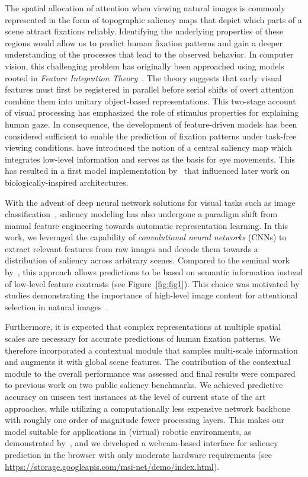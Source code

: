 \documentclass[final,1p,times,number]{elsarticle}
\begin{document}
The spatial allocation of attention when viewing natural images is commonly represented in the form of topographic saliency maps that depict which parts of a scene attract fixations reliably. Identifying the underlying properties of these regions would allow us to predict human fixation patterns and gain a deeper understanding of the processes that lead to the observed behavior. In computer vision, this challenging problem has originally been approached using models rooted in \textit{Feature Integration Theory}~\cite{treisman1980feature}. The theory suggests that early visual features must first be registered in parallel before serial shifts of overt attention combine them into unitary object-based representations. This two-stage account of visual processing has emphasized the role of stimulus properties for explaining human gaze. In consequence, the development of feature-driven models has been considered sufficient to enable the prediction of fixation patterns under task-free viewing conditions. \citet{Koch1985ShiftsIS} have introduced the notion of a central saliency map which integrates low-level information and serves as the basis for eye movements. This has resulted in a first model implementation by~\citet{itti1998model} that influenced later work on biologically-inspired architectures.

With the advent of deep neural network solutions for visual tasks such as image classification~\cite{krizhevsky2012imagenet}, saliency modeling has also undergone a paradigm shift from manual feature engineering towards automatic representation learning. In this work, we leveraged the capability of \textit{convolutional neural networks} (CNNs) to extract relevant features from raw images and decode them towards a distribution of saliency across arbitrary scenes. Compared to the seminal work by~\citet{itti1998model}, this approach allows predictions to be based on semantic information instead of low-level feature contrasts (see Figure~\ref{fig:fig1}). This choice was motivated by studies demonstrating the importance of high-level image content for attentional selection in natural images~\cite{einhauser2008objects,nuthmann2010object}.

Furthermore, it is expected that complex representations at multiple spatial scales are necessary for accurate predictions of human fixation patterns. We therefore incorporated a contextual module that samples multi-scale information and augments it with global scene features. The contribution of the contextual module to the overall performance was assessed and final results were compared to previous work on two public saliency benchmarks. We achieved predictive accuracy on unseen test instances at the level of current state of the art approaches, while utilizing a computationally less expensive network backbone with roughly one order of magnitude fewer processing layers. This makes our model suitable for applications in (virtual) robotic environments, as demonstrated by~\citet{bornet2019running}, and we developed a webcam-based interface for saliency prediction in the browser with only moderate hardware requirements (see \url{https://storage.googleapis.com/msi-net/demo/index.html}).
\end{document}
